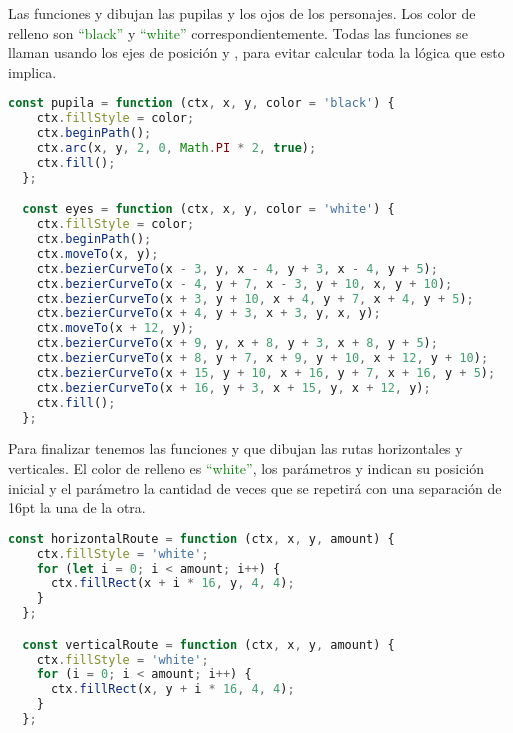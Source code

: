 \vspace{5mm} %


Las funciones  y  dibujan las pupilas y los ojos de los personajes. Los color de relleno son \textcolor{green}{``black''} y \textcolor{green}{``white''} correspondientemente. Todas las funciones se llaman usando los ejes de posición  y , para evitar calcular toda la lógica que esto implica.

\begin{lstlisting}[language=TypeScript, style=mystyle]
  const pupila = function (ctx, x, y, color = 'black') {
    ctx.fillStyle = color;
    ctx.beginPath();
    ctx.arc(x, y, 2, 0, Math.PI * 2, true);
    ctx.fill();
  };

  const eyes = function (ctx, x, y, color = 'white') {
    ctx.fillStyle = color;
    ctx.beginPath();
    ctx.moveTo(x, y);
    ctx.bezierCurveTo(x - 3, y, x - 4, y + 3, x - 4, y + 5);
    ctx.bezierCurveTo(x - 4, y + 7, x - 3, y + 10, x, y + 10);
    ctx.bezierCurveTo(x + 3, y + 10, x + 4, y + 7, x + 4, y + 5);
    ctx.bezierCurveTo(x + 4, y + 3, x + 3, y, x, y);
    ctx.moveTo(x + 12, y);
    ctx.bezierCurveTo(x + 9, y, x + 8, y + 3, x + 8, y + 5);
    ctx.bezierCurveTo(x + 8, y + 7, x + 9, y + 10, x + 12, y + 10);
    ctx.bezierCurveTo(x + 15, y + 10, x + 16, y + 7, x + 16, y + 5);
    ctx.bezierCurveTo(x + 16, y + 3, x + 15, y, x + 12, y);
    ctx.fill();
  };
\end{lstlisting}

\newpage %
Para finalizar tenemos las funciones  y  que dibujan las rutas horizontales y verticales. El color de relleno es \textcolor{green}{``white''}, los parámetros  y  indican su posición inicial y el parámetro  la cantidad de veces que se repetirá con una separación de 16pt la una de la otra.

\begin{lstlisting}[language=TypeScript, style=mystyle]
  const horizontalRoute = function (ctx, x, y, amount) {
    ctx.fillStyle = 'white';
    for (let i = 0; i < amount; i++) {
      ctx.fillRect(x + i * 16, y, 4, 4);
    }
  };

  const verticalRoute = function (ctx, x, y, amount) {
    ctx.fillStyle = 'white';
    for (i = 0; i < amount; i++) {
      ctx.fillRect(x, y + i * 16, 4, 4);
    }
  };
\end{lstlisting}

